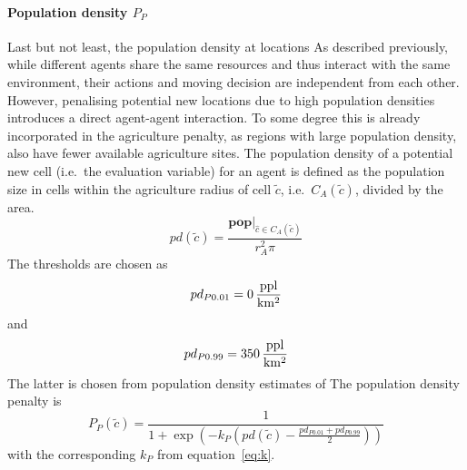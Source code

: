 \paragraph{Population density $P_P$}
Last but not least, the population density at locations 
As described previously, while different agents share the same resources and thus interact with the same environment, their actions and moving decision are independent from each other. 
However, penalising potential new locations due to high population densities introduces a direct agent-agent interaction. 
To some degree this is already incorporated in the agriculture penalty, as regions with large population density, also have fewer available agriculture sites.
The population density of a potential new cell (i.e.\ the evaluation variable) for an agent is defined as the population size in cells within the agriculture radius of cell $\tilde{c}$, i.e.\ $C_A(\tilde{c})$, divided by the area.
\begin{equation}
	pd (\tilde{c}) = \frac{\mathbf{pop}|_{\hat{c} \in C_A(\tilde{c}) }}{r_A^2 \pi}
\end{equation}
The thresholds are chosen as
\begin{equation}
	pd_{P0.01} = 0 \, {\rm \frac{ppl}{km^2}}
\end{equation}
and 
\begin{equation}
	pd_{P0.99} = 350 \, {\rm \frac{ppl}{km^2}}
\end{equation}
The latter is chosen from population density estimates of 
The population density penalty is 
\begin{equation}
	P_P(\tilde{c}) = \frac{1}{1+\exp\left( - k_P (pd(\tilde{c})-\frac{pd_{P0.01} + pd_{P0.99}}{2}) \right)}
\end{equation}
with the corresponding $k_P$ from equation~\ref{eq:k}.

